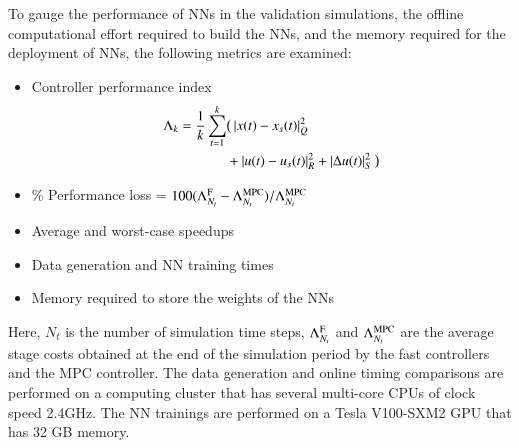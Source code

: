 \documentclass[preprint,5p, twocolumn, authoryear]{elsarticle}
\begin{document}
To gauge the performance of NNs in the validation simulations, the offline
computational effort required to build the NNs, and the memory required for the
deployment of NNs, the following metrics are examined:

\begin{itemize}
    \item Controller performance index
    \begin{align*}        
    \Lambda_k = \dfrac{1}{k}\sum_{t=1}^{k} & \big(\left| x(t) - x_{s} (t) \right|^2_{Q} \\
        & + \left| u(t) - u_{s} (t) \right|^2_{R} + \left| \Delta u(t) \right|^2_{S}\big)         
    \end{align*}
    \item \% Performance loss = $100(\Lambda^{\textnormal{F}}_{N_{t}} -
    \Lambda^{\textnormal{MPC}}_{N_{t}})/\Lambda^{\textnormal{MPC}}_{N_{t}}$
    \item Average and worst-case speedups
    \item Data generation and NN training times
    \item Memory required to store the weights of the NNs
\end{itemize}
Here, $N_t$ is the number of simulation time steps,  
$\Lambda^{\textnormal{F}}_{N_{t}}$ and $\Lambda^{\textnormal{MPC}}_{N_{t}}$ are
the average stage costs obtained at the end of the simulation period by the fast
controllers and the MPC controller. The data generation and online timing
comparisons are performed on a computing cluster that has several multi-core
CPUs of clock speed 2.4GHz. The NN trainings are performed on a Tesla V100-SXM2
GPU that has 32 GB memory.
\end{document}
